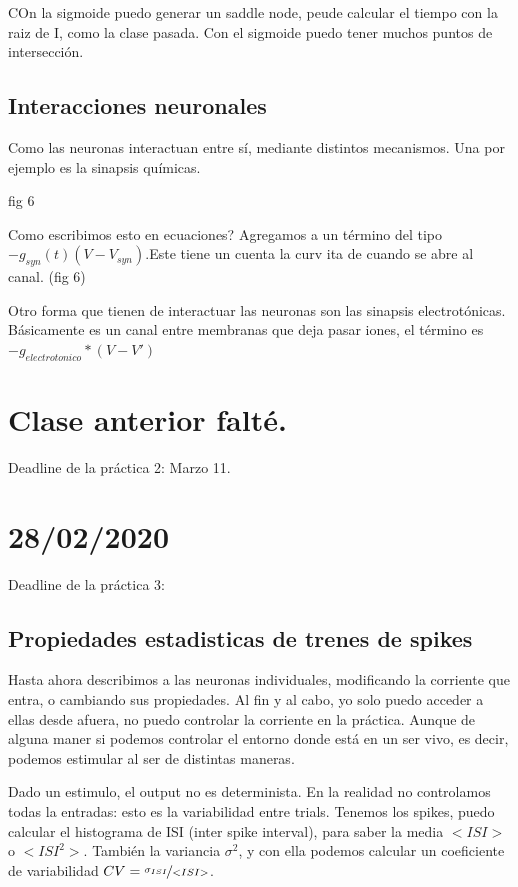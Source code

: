COn la sigmoide puedo generar un saddle node, peude calcular el tiempo con la raiz de I, como la clase pasada. Con el sigmoide puedo tener muchos puntos de intersección.


\subsection{Interacciones neuronales}

Como las neuronas interactuan entre sí, mediante distintos mecanismos. Una por ejemplo es  la sinapsis químicas. 

fig 6

Como escribimos esto en ecuaciones? Agregamos a un término del tipo $-g_{syn}(t)(V-V_{syn})$.Este tiene un cuenta la curv
ita de cuando se abre al canal. (fig 6)

Otro forma que tienen de interactuar las neuronas son las sinapsis electrotónicas. Básicamente es un canal entre membranas que deja pasar iones, el término es $-g_{electrotonico}*(V-V')$

\section{Clase anterior falté.}

Deadline de la práctica 2: Marzo 11.

\section{28/02/2020}

Deadline de la práctica 3:

\subsection{Propiedades estadisticas de trenes de spikes}

Hasta ahora describimos a las neuronas individuales, modificando la corriente que entra, o cambiando sus propiedades. Al fin y al cabo, yo solo puedo acceder a ellas desde afuera, no puedo controlar la corriente en la práctica. Aunque de alguna maner  si podemos controlar el entorno donde está en un ser vivo, es decir, podemos estimular al ser de distintas maneras.

Dado un estimulo, el output no es determinista. En la realidad no controlamos todas la entradas: esto es la variabilidad entre trials. Tenemos los spikes, puedo calcular el histograma de ISI (inter spike interval), para saber la media $<ISI>$ o $<ISI^2>$. También la variancia $\sigma^2$, y con ella podemos calcular un coeficiente de variabilidad $CV = \nicefrac{\sigma_{ISI}}{<ISI>}$.

